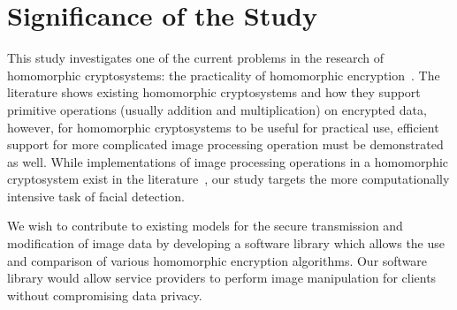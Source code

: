 \section{Significance of the Study}

This study investigates one of the current problems in the research of homomorphic cryptosystems: the practicality of homomorphic encryption~\cite{sen_homomorphic_2013}. The literature shows existing homomorphic cryptosystems and how they support primitive operations (usually addition and multiplication) on encrypted data, however, for homomorphic cryptosystems to be useful for practical use, efficient support for more complicated image processing operation must be demonstrated as well. While implementations of image processing operations in a homomorphic cryptosystem exist in the literature~\cite{ziad_cryptoimg:_2016, garay_algorithms_2014}, our study targets the more computationally intensive task of facial detection.

We wish to contribute to existing models for the secure transmission and modification of image data by developing a software library which allows the use and comparison of various homomorphic encryption algorithms. Our software library would allow service providers to perform image manipulation for clients without compromising data privacy.
